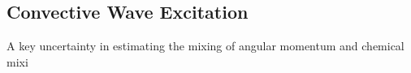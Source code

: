 {\color{purple}
\subsection{Convective Wave Excitation}
}

A key uncertainty in estimating the mixing of angular momentum and chemical mixi
